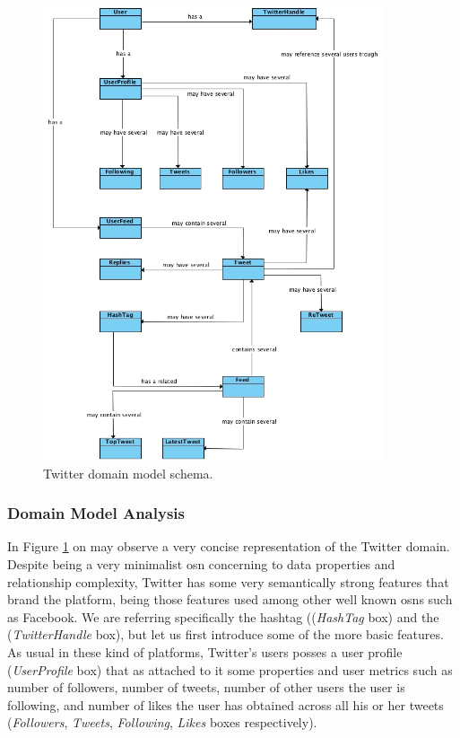 \begin{figure}[h!]
  \hspace*{-0.4in}
  \includegraphics[width=0.9\textwidth]{img/twitter-domain-model.jpg}
\caption{\label{img:twitter} Twitter domain model schema.}
\end{figure}

\subsubsection*{Domain Model Analysis}
In Figure \ref{img:twitter} on may observe a very concise representation of the Twitter domain. Despite being a very minimalist \gls{osn}
concerning to data properties and relationship complexity, Twitter has some very semantically strong features that brand the platform, being those
features used among other well known \glspl{osn} such as Facebook. We are referring specifically the hashtag ((\textit{HashTag} box) and the (\textit{TwitterHandle} box),
but let us first introduce some of the more basic features.\\

\indent As usual in these kind of platforms, Twitter's users posses a user profile
(\textit{UserProfile} box) that as attached to it some properties and user metrics such as number of followers, number of tweets, number of
other users the user is following, and number of likes the user has obtained across all his or her tweets (\textit{Followers}, \textit{Tweets}, \textit{Following}, \textit{Likes} boxes respectively).\\

